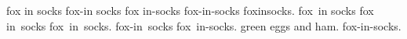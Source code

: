 \documentclass{article}
\begin{document}
fox in socks fox-in socks fox in-socks fox-in-socks foxinsocks.
fox~in socks fox in~socks fox~in~socks.
fox-in~socks fox~in-socks.
green eggs and ham.
fox-in-socks.
\checkhyphenation{}
\end{document}
